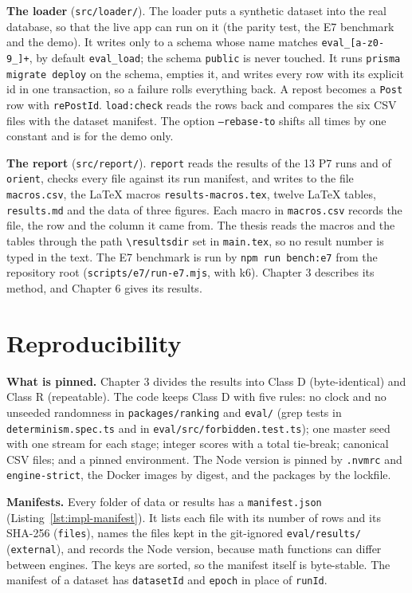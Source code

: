 \textbf{The loader} (\texttt{src/loader/}). The loader puts a synthetic dataset into the real database, so that the live app can run on it (the parity test, the E7 benchmark and the demo). It writes only to a schema whose name matches \texttt{eval\_[a-z0-9\_]+}, by default \texttt{eval\_load}; the schema \texttt{public} is never touched. It runs \texttt{prisma migrate deploy} on the schema, empties it, and writes every row with its explicit id in one transaction, so a failure rolls everything back. A repost becomes a \texttt{Post} row with \texttt{rePostId}. \texttt{load:check} reads the rows back and compares the six CSV files with the dataset manifest. The option \texttt{--rebase-to} shifts all times by one constant and is for the demo only.

\textbf{The report} (\texttt{src/report/}). \texttt{report} reads the results of the 13 P7 runs and of \texttt{orient}, checks every file against its run manifest, and writes to  the file \texttt{macros.csv}, the LaTeX macros \texttt{results-macros.tex}, twelve LaTeX tables, \texttt{results.md} and the data of three figures. Each macro in \texttt{macros.csv} records the file, the row and the column it came from. The thesis reads the macros and the tables through the path \texttt{\textbackslash resultsdir} set in \texttt{main.tex}, so no result number is typed in the text. The E7 benchmark is run by \texttt{npm run bench:e7} from the repository root (\texttt{scripts/e7/run-e7.mjs}, with k6). Chapter 3 describes its method, and Chapter 6 gives its results.

\section{Reproducibility}
\label{sec:impl-repro}

\textbf{What is pinned.} Chapter 3 divides the results into Class D (byte-identical) and Class R (repeatable). The code keeps Class D with five rules: no clock and no unseeded randomness in \texttt{packages/ranking} and \texttt{eval/} (grep tests in \texttt{determinism.spec.ts} and in \texttt{eval/src/forbidden.test.ts}); one master seed with one stream for each stage; integer scores with a total tie-break; canonical CSV files; and a pinned environment. The Node version is pinned by \texttt{.nvmrc} and \texttt{engine-strict}, the Docker images by digest, and the packages by the lockfile.

\textbf{Manifests.} Every folder of data or results has a \texttt{manifest.json} (Listing~\ref{lst:impl-manifest}). It lists each file with its number of rows and its SHA-256 (\texttt{files}), names the files kept in the git-ignored \texttt{eval/results/} (\texttt{external}), and records the Node version, because math functions can differ between engines. The keys are sorted, so the manifest itself is byte-stable. The manifest of a dataset has \texttt{datasetId} and \texttt{epoch} in place of \texttt{runId}.

